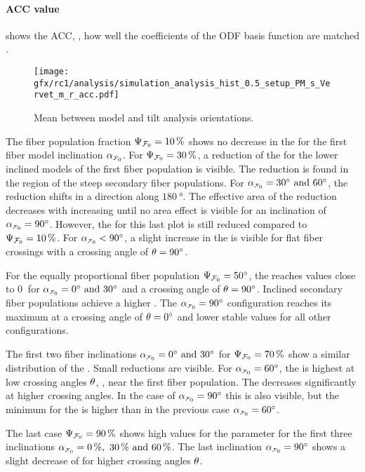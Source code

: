 \paragraph{\acs{ACC} value}
%
 shows the  \ac{ACC}, \ie{}, how well the coefficients of the \ac{ODF} basis function are matched \cite{Schilling2018}.
\par
%
\begin{figure}[!p]
\centering
\texttt{[image: gfx/rc1/analysis/simulation\_analysis\_hist\_0.5\_setup\_PM\_s\_Vervet\_m\_r\_acc.pdf]}
\caption[]{Mean \accvalue{} between model and tilt analysis orientations.}
\label{fig:sim_ana_acc}
\end{figure}
%
The fiber population fraction $\textnormal{$\Psi_{\textnormal{$\mathcal{F}_0$}}$}=\SI{10}{\percent}$ shows no decrease in the \accvalue{} for the first fiber model inclination $\modelInc$.
For $\textnormal{$\Psi_{\textnormal{$\mathcal{F}_0$}}$}=\SI{30}{\percent}$, a reduction of the \accvalue{} for the lower inclined models of the first fiber population is visible.
The reduction is found in the region of the steep secondary fiber populations.
For $\modelInc = \SIlist{30;60}{\degree}$, the reduction shifts in a direction along $\SI{180}{\degree}$.
The effective area of the reduction decreases with increasing \modelInc{} until no area effect is visible for an inclination of $\modelInc=\SI{90}{\degree}$.
However, the \accvalue{} for this last plot is still reduced compared to $\textnormal{$\Psi_{\textnormal{$\mathcal{F}_0$}}$}=\SI{10}{\percent}$.
For $\modelInc < \SI{90}{\degree}$, a slight increase in the \accvalue{} is visible for flat fiber crossings with a crossing angle of $\textnormal{$\theta$}=\SI{90}{\degree}$.
\par
%
For the equally proportional fiber population $\textnormal{$\Psi_{\textnormal{$\mathcal{F}_0$}}$} = \SI{50}{\degree}$, the \accvalue{} reaches values close to $\SI{0}{}$ for $\modelInc = \SIlist{0;30}{\degree}$ and a crossing angle of $\textnormal{$\theta$}=\SI{90}{\degree}$.
Inclined secondary fiber populations achieve a higher \accvalue{}.
The $\modelInc = \SI{90}{\degree}$ configuration reaches its maximum \accvalue{} at a crossing angle of $\textnormal{$\theta$}=\SI{0}{\degree}$ and lower stable values for all other configurations.
\par
%
The first two fiber inclinations $\modelInc = \SIlist{0;30}{\degree}$ for $\textnormal{$\Psi_{\textnormal{$\mathcal{F}_0$}}$}=\SI{70}{\percent}$ show a similar distribution of the \accvalue{}.
Small reductions are visible.
For $\modelInc=\SI{60}{\degree}$, the \accvalue{} is highest at low crossing angles $\textnormal{$\theta$}$, \ie{}, near the first fiber population.
The \accvalue{} decreases significantly at higher crossing angles.
In the case of $\modelInc=\SI{90}{\degree}$ this is also visible, but the minimum for the \accvalue{} is higher than in the previous case $\modelInc=\SI{60}{\degree}$.
\par
%
The last case $\textnormal{$\Psi_{\textnormal{$\mathcal{F}_0$}}$}=\SI{90}{\percent}$ shows high values for the \accvalue{} parameter for the first three inclinations $\modelInc=\SIlist{0;30;60}{\percent}$.
The last inclination $\modelInc=\SI{90}{\degree}$ shows a slight decrease of \accvalue{} for higher crossing angles $\textnormal{$\theta$}$.
%
%
%

